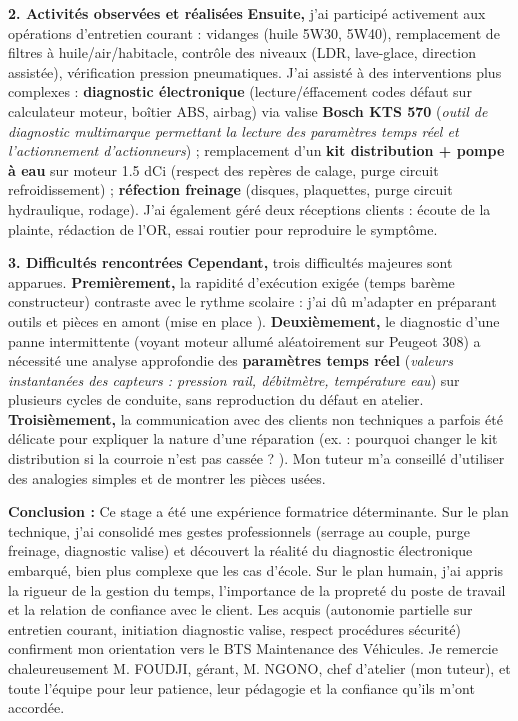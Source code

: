 \documentclass[11pt]{article}
\begin{document}
\begin{exemplebox}
\textbf{2. Activités observées et réalisées}
\textbf{Ensuite,} j'ai participé activement aux opérations d'entretien courant : vidanges (huile 5W30, 5W40), remplacement de filtres à huile/air/habitacle, contrôle des niveaux (LDR, lave-glace, direction assistée), vérification pression pneumatiques. J'ai assisté à des interventions plus complexes : \textbf{diagnostic électronique} (lecture/éffacement codes défaut sur calculateur moteur, boîtier ABS, airbag) via valise \textbf{Bosch KTS 570} (\emph{outil de diagnostic multimarque permettant la lecture des paramètres temps réel et l'actionnement d'actionneurs}) ; remplacement d'un \textbf{kit distribution + pompe à eau} sur moteur 1.5 dCi (respect des repères de calage, purge circuit refroidissement) ; \textbf{réfection freinage} (disques, plaquettes, purge circuit hydraulique, rodage). J'ai également géré deux réceptions clients : écoute de la plainte, rédaction de l'OR, essai routier pour reproduire le symptôme.

\textbf{3. Difficultés rencontrées}
\textbf{Cependant,} trois difficultés majeures sont apparues. \textbf{Premièrement,} la rapidité d'exécution exigée (temps barème constructeur) contraste avec le rythme scolaire : j'ai dû m'adapter en préparant outils et pièces en amont (\og mise en place \fg). \textbf{Deuxièmement,} le diagnostic d'une panne intermittente (voyant moteur allumé aléatoirement sur Peugeot 308) a nécessité une analyse approfondie des \textbf{paramètres temps réel} (\emph{valeurs instantanées des capteurs : pression rail, débitmètre, température eau}) sur plusieurs cycles de conduite, sans reproduction du défaut en atelier. \textbf{Troisièmement,} la communication avec des clients non techniques a parfois été délicate pour expliquer la nature d'une réparation (ex. : \og pourquoi changer le kit distribution si la courroie n'est pas cassée ? \fg). Mon tuteur m'a conseillé d'utiliser des analogies simples et de montrer les pièces usées.

\textbf{Conclusion :}
Ce stage a été une expérience formatrice déterminante. Sur le plan technique, j'ai consolidé mes gestes professionnels (serrage au couple, purge freinage, diagnostic valise) et découvert la réalité du diagnostic électronique embarqué, bien plus complexe que les cas d'école. Sur le plan humain, j'ai appris la rigueur de la gestion du temps, l'importance de la propreté du poste de travail et la relation de confiance avec le client. Les acquis (autonomie partielle sur entretien courant, initiation diagnostic valise, respect procédures sécurité) confirment mon orientation vers le BTS Maintenance des Véhicules. Je remercie chaleureusement M. FOUDJI, gérant, M. NGONO, chef d'atelier (mon tuteur), et toute l'équipe pour leur patience, leur pédagogie et la confiance qu'ils m'ont accordée.


\end{exemplebox}
\end{document}
